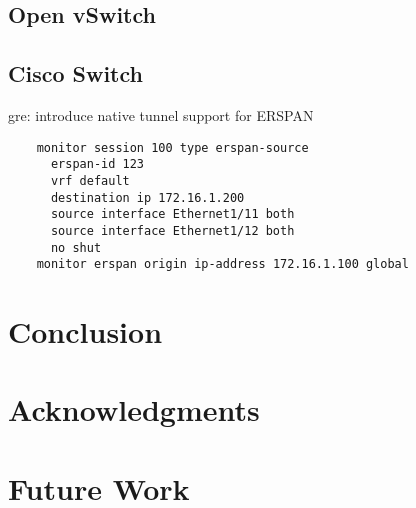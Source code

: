 \documentclass{sigplanconf}
\begin{document}
\subsection{Open vSwitch}\label{ovs}
\subsection{Cisco Switch}
    gre: introduce native tunnel support for ERSPAN

\begin{verbatim}
    monitor session 100 type erspan-source
      erspan-id 123
      vrf default
      destination ip 172.16.1.200
      source interface Ethernet1/11 both
      source interface Ethernet1/12 both
      no shut
    monitor erspan origin ip-address 172.16.1.100 global
\end{verbatim}

\section{Conclusion}
\section{Acknowledgments}
\section{Future Work}

                                                                                                   

\end{document}
